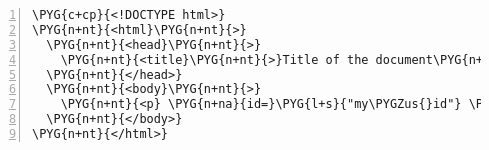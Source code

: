 \begin{Verbatim}[commandchars=\\\{\},numbers=left,stepnumber=1,codes={\catcode`\$=3\catcode`\^=7\catcode`\_=8}]
\PYG{c+cp}{<!DOCTYPE html>}
\PYG{n+nt}{<html}\PYG{n+nt}{>}
  \PYG{n+nt}{<head}\PYG{n+nt}{>}
    \PYG{n+nt}{<title}\PYG{n+nt}{>}Title of the document\PYG{n+nt}{</title>}
  \PYG{n+nt}{</head>}
  \PYG{n+nt}{<body}\PYG{n+nt}{>}
    \PYG{n+nt}{<p} \PYG{n+na}{id=}\PYG{l+s}{"my\PYGZus{}id"} \PYG{n+na}{class=}\PYG{l+s}{"my\PYGZus{}class1, my\PYGZus{}class2"}\PYG{n+nt}{>}Hello world!\PYG{n+nt}{</p>}
  \PYG{n+nt}{</body>}
\PYG{n+nt}{</html>}
\end{Verbatim}
